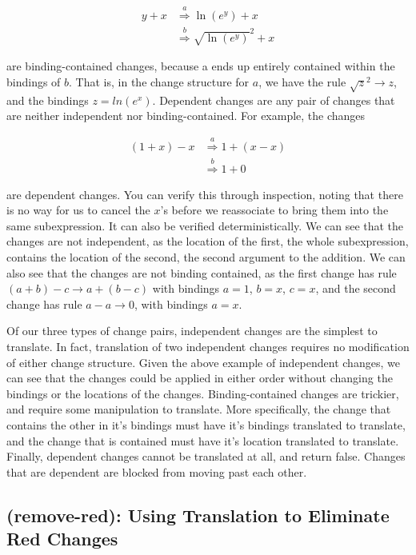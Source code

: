 \documentclass{article}
\newcommand{\insetarrow}[1]{\stackrel{#1}{\Rightarrow}}
\newcommand{\lnexp}[1]{\ln{\left(e^{#1}\right)}}
\begin{document}
\begin{align*}
y + x &\insetarrow{a} \lnexp{y} + x \\
&\insetarrow{b} \sqrt{\lnexp{y}}^2 + x
\end{align*}

are binding-contained changes, 
because a ends up entirely contained within the bindings of $b$. 
That is, 
in the change structure for $a$, 
we have the rule $\sqrt{z}^2 \to z$,
and the bindings $z = ln\left(e^x\right)$.
Dependent changes are any pair of changes 
that are neither independent nor binding-contained. 
For example, 
the changes 

\begin{align*}
(1 + x) - x &\insetarrow{a} 1 + (x - x) \\
&\insetarrow{b} 1 + 0
\end{align*}

are dependent changes. 
You can verify this through inspection, 
noting that there is no way 
for us to cancel the $x$'s 
before we reassociate 
to bring them into the same subexpression. 
It can also be verified deterministically. 
We can see that the changes are not independent, 
as the location of the first, 
the whole subexpression, 
contains the location of the second, 
the second argument to the addition. 
We can also see that the changes are not binding contained, 
as the first change has rule $(a + b) - c \to a + (b - c)$
with bindings $a = 1$, 
$b = x$, 
$c = x$, 
and the second change has rule $a - a \to 0$, 
with bindings $a = x$.

Of our three types of change pairs, 
independent changes are the simplest to translate. 
In fact, 
translation of two independent changes 
requires no modification of either change structure. 
Given the above example of independent changes, 
we can see that the changes could be applied 
in either order 
without changing the bindings 
or the locations of the changes. 
Binding-contained changes are trickier, 
and require some manipulation to translate. 
More specifically, 
the change that contains the other in it's 
bindings must have it's bindings translated 
to translate, 
and the change that is contained 
must have it's location translated 
to translate. 
Finally, dependent changes cannot be translated at all, 
and return false. 
Changes that are dependent 
are blocked from moving past each other.

\subsection{(remove-red): Using Translation to Eliminate Red Changes}
\end{document}
